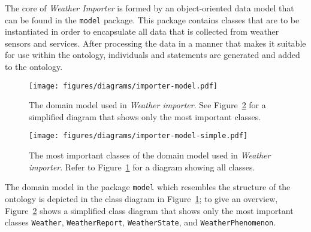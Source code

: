 The core of \emph{Weather Importer} is formed by an object-oriented data model that can be found in the \texttt{model} package. This package contains classes that are to be instantiated in order to encapsulate all data that is collected from weather sensors and services. After processing the data in a manner that makes it suitable for use within the \smarthomeweather ontology, individuals and statements are generated and added to the ontology.

\begin{figure}
\centering
\texttt{[image: figures/diagrams/importer-model.pdf]}
\caption{The domain model used in \emph{Weather importer}. See Figure~\ref{fig:importer_model2} for a simplified diagram that shows only the most important classes.}
\label{fig:importer_model1}
\end{figure}

\begin{figure}
\centering
\texttt{[image: figures/diagrams/importer-model-simple.pdf]}
\caption{The most important classes of the domain model used in \emph{Weather importer}. Refer to Figure~\ref{fig:importer_model1} for a diagram showing all classes.}
\label{fig:importer_model2}
\end{figure}

The domain model in the package \texttt{model} which resembles the structure of the \smarthomeweather ontology is depicted in the  class diagram in Figure~\ref{fig:importer_model1}; to give an overview, Figure~\ref{fig:importer_model2} shows a simplified class diagram that shows only the most important classes \texttt{Weather}, \texttt{WeatherReport}, \texttt{WeatherState}, and \texttt{WeatherPhenomenon}.

